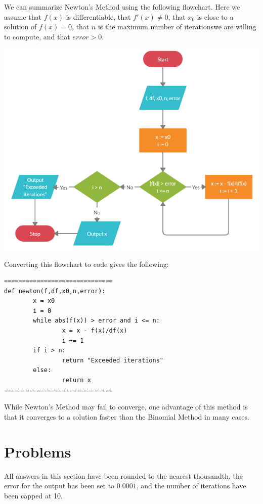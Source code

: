 \documentclass{ximera}
\begin{document}
We can summarize Newton's Method using the following flowchart. Here we assume that $f(x)$ is differentiable, that $f'(x)\neq 0$, that $x_0$ is close to a solution of $f(x)=0$, that $n$ is the maximum number of iterationswe are willing to compute, and that $error>0$.

\begin{center}
	\includegraphics{newton.png}
\end{center}

Converting this flowchart to code gives the following:

\begin{verbatim}
==============================
def newton(f,df,x0,n,error):
        x = x0
        i = 0
        while abs(f(x)) > error and i <= n:
                x = x - f(x)/df(x)
                i += 1
        if i > n:
                return "Exceeded iterations"
        else:
                return x
==============================
\end{verbatim}

While Newton's Method may fail to converge, one advantage of this method is that it converges to a solution faster than the Binomial Method in many cases.

\section{Problems}

All answers in this section have been rounded to the nearest thousandth, the error for the output has been set to $0.0001$, and the number of iterations have been capped at 10.
\end{document}
